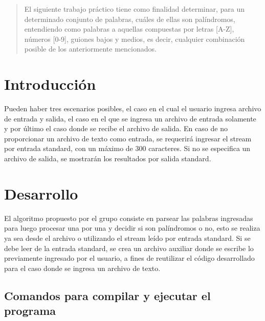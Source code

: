 \documentclass[a4paper]{article}
\begin{document}

\fecha{\today}


\maketitle

\begin{abstract}
El siguiente trabajo práctico tiene como finalidad determinar, para un determinado conjunto de palabras, cuáles de ellas son palíndromos, entendiendo como palabras a aquellas compuestas por letras [A-Z], números [0-9], guiones bajos y medios, es decir, cualquier combinación posible de los anteriormente mencionados. 
\end{abstract}


\section{Introducción}
Pueden haber tres escenarios posibles, el caso en el cual el usuario ingresa archivo de entrada y salida, el caso en el que se ingresa un archivo de entrada solamente y por último el caso donde se recibe el archivo de salida. En caso de no proporcionar un archivo de texto como entrada, se requerirá ingresar el stream por entrada standard, con un máximo de 300 caracteres. Si no se especifica un archivo de salida, se mostrarán los resultados por salida standard. 


\section{Desarrollo}

El algoritmo propuesto por el grupo consiste en parsear las palabras ingresadas para luego procesar una por una y decidir si son palíndromos o no, esto se realiza ya sea desde el archivo o utilizando el stream leído por entrada standard. Si se debe leer de la entrada standard, se crea un archivo auxiliar donde se escribe lo previamente ingresado por el usuario, a fines de reutilizar el código desarrollado para el caso donde se ingresa un archivo de texto.

\subsection{Comandos para compilar y ejecutar el programa}
\end{document}
